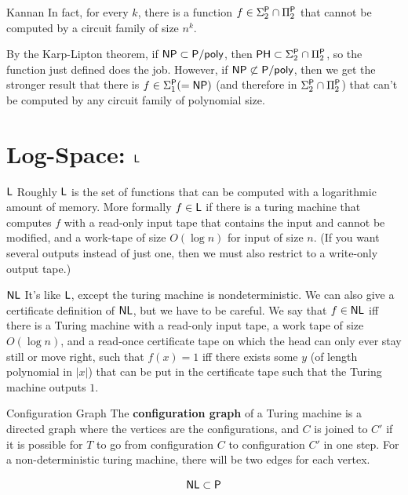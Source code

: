 \documentclass{article}
\begin{document}
\begin{corr}{Kannan}
    In fact, for every $k$, there is a function $f \in \Sigma_{2}^{\mathsf{P}} \cap \Pi_{2}^{\mathsf{P}}$ that cannot be computed by a circuit family of size $n^{k}$.
\end{corr}
\proof By the Karp-Lipton theorem, if $\mathsf{NP} \subset \mathsf{P/poly}$, then $\mathsf{PH} \subset \Sigma_{2}^{\mathsf{P}} \cap \Pi_{2}^{\mathsf{P}}$, so the function just defined does the job. \gap However, if $\mathsf{NP} \not\subset \mathsf{P/poly}$, then we get the stronger result that there is $f \in \Sigma_{1}^{\mathsf{P}} ( = \mathsf{NP})$ (and therefore in $\Sigma_{2}^{\mathsf{P}} \cap \Pi_{2}^{\mathsf{P}}$) that can't be computed by any circuit family of polynomial size. \endproof
\section{Log-Space: $\mathsf{L}$}
\begin{fancydefine}{$\mathsf{L}$}
    Roughly $\mathsf{L}$ is the set of functions that can be computed with a logarithmic amount of memory. \gap More formally $f \in \mathsf{L}$ if there is a turing machine that computes $f$ with a read-only input tape that contains the input and cannot be modified, and a work-tape of size $O(\log n)$ for input of size $n$.\gap 
    (If you want several outputs instead of just one, then we must also restrict to a write-only output tape.)
\end{fancydefine}
\begin{fancydefine}{$\mathsf{NL}$}
    It's like $\mathsf{L}$, except the turing machine is nondeterministic. \gap We can also give a certificate definition of $\mathsf{NL}$, but we have to be careful. We say that $f \in \mathsf{NL}$ iff there is a Turing machine with a read-only input tape, a work tape of size $O(\log n)$, and a read-once certificate tape on which the head can only ever stay still or move right, such that $f(x)=1$ iff there exists some $y$ (of length polynomial in $|x|$) that can be put in the certificate tape such that the Turing machine outputs $1$.
\end{fancydefine}
\begin{fancydefine}{Configuration Graph}
    The \textbf{configuration graph} of a Turing machine is a directed graph where the vertices are the configurations, and $C$ is joined to $C'$ if it is possible for $T$ to go from configuration $C$ to configuration $C'$ in one step. For a non-deterministic turing machine, there will be two  edges for each vertex.
\end{fancydefine}
\begin{fancyprop}{}
    \[\mathsf{NL} \subset \mathsf{P}\]
\end{fancyprop}
\end{document}
